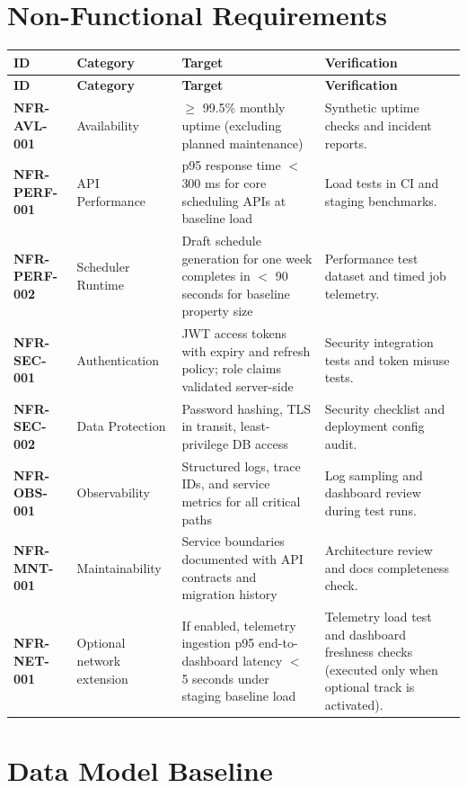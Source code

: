 \documentclass[11pt,a4paper]{article}
\newcommand{\req}[1]{\textbf{\textcolor{Primary}{#1}}}
\newcommand{\thead}[1]{\textcolor{HeaderText}{\textbf{#1}}}
\begin{document}
\section{Non-Functional Requirements}
\begin{longtable}{P{0.14\textwidth}P{0.21\textwidth}P{0.20\textwidth}P{0.27\textwidth}}
\toprule
{}
\thead{ID} & \thead{Category} & \thead{Target} & \thead{Verification} \\
\midrule
\endfirsthead
\toprule
{}
\thead{ID} & \thead{Category} & \thead{Target} & \thead{Verification} \\
\midrule
\endhead
\req{NFR-AVL-001} & Availability & $\geq$ 99.5\% monthly uptime (excluding planned maintenance) & Synthetic uptime checks and incident reports. \\
\req{NFR-PERF-001} & API Performance & p95 response time $<$ 300 ms for core scheduling APIs at baseline load & Load tests in CI and staging benchmarks. \\
\req{NFR-PERF-002} & Scheduler Runtime & Draft schedule generation for one week completes in $<$ 90 seconds for baseline property size & Performance test dataset and timed job telemetry. \\
\req{NFR-SEC-001} & Authentication & JWT access tokens with expiry and refresh policy; role claims validated server-side & Security integration tests and token misuse tests. \\
\req{NFR-SEC-002} & Data Protection & Password hashing, TLS in transit, least-privilege DB access & Security checklist and deployment config audit. \\
\req{NFR-OBS-001} & Observability & Structured logs, trace IDs, and service metrics for all critical paths & Log sampling and dashboard review during test runs. \\
\req{NFR-MNT-001} & Maintainability & Service boundaries documented with API contracts and migration history & Architecture review and docs completeness check. \\
\req{NFR-NET-001} & Optional network extension & If enabled, telemetry ingestion p95 end-to-dashboard latency $<$ 5 seconds under staging baseline load & Telemetry load test and dashboard freshness checks (executed only when optional track is activated). \\
\bottomrule
\end{longtable}

\section{Data Model Baseline}
\end{document}
